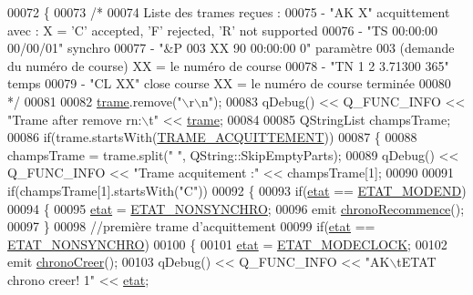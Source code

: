 \begin{DoxyCode}
00072 \{
00073     \textcolor{comment}{/*}
00074 \textcolor{comment}{      Liste des trames reçues :}
00075 \textcolor{comment}{      - "AK X" acquittement avec : X = 'C' accepted, 'F' rejected, 'R' not supported}
00076 \textcolor{comment}{      - "TS 00:00:00 00/00/01" synchro}
00077 \textcolor{comment}{      - "&P 003 XX 90 00:00:00 0" paramètre 003 (demande du numéro de course) XX = le numéro de course}
00078 \textcolor{comment}{      - "TN 1 2     3.71300  365" temps}
00079 \textcolor{comment}{      - "CL XX" close course XX = le numéro de course terminée}
00080 \textcolor{comment}{     */}
00081 
00082     \hyperlink{class_chrono_a26f2155aa6e5ef4296e5456b64a713b5}{trame}.remove(\textcolor{stringliteral}{"\(\backslash\)r\(\backslash\)n"});
00083     qDebug() << Q\_FUNC\_INFO << \textcolor{stringliteral}{"Trame after remove rn:\(\backslash\)t"} << \hyperlink{class_chrono_a26f2155aa6e5ef4296e5456b64a713b5}{trame};
00084 
00085     QStringList champsTrame;
00086     \textcolor{keywordflow}{if}(trame.startsWith(\hyperlink{chrono_8h_a2c9f7b58ba826bd8365c9a611389fe42}{TRAME\_ACQUITTEMENT}))
00087     \{
00088         champsTrame = trame.split(\textcolor{stringliteral}{" "}, QString::SkipEmptyParts);
00089         qDebug() << Q\_FUNC\_INFO << \textcolor{stringliteral}{"Trame acquitement :"} << champsTrame[1];
00090 
00091         \textcolor{keywordflow}{if}(champsTrame[1].startsWith(\textcolor{stringliteral}{"C"}))
00092         \{
00093             \textcolor{keywordflow}{if}(\hyperlink{class_chrono_ad82d4f2a230290aa9695f12bf5ac02e8}{etat} == \hyperlink{chrono_8h_a8d3c4247ab94fd8e6757811fb4001f1e}{ETAT\_MODEND})
00094             \{
00095                 \hyperlink{class_chrono_ad82d4f2a230290aa9695f12bf5ac02e8}{etat} = \hyperlink{chrono_8h_af1a61de8ee28781dbc28e0d7d43c158e}{ETAT\_NONSYNCHRO};
00096                 emit \hyperlink{class_chrono_ab697687f26503bee2b9c9e6f2a073f14}{chronoRecommence}();
00097             \}
00098             \textcolor{comment}{//première trame d'acquittement}
00099             \textcolor{keywordflow}{if}(\hyperlink{class_chrono_ad82d4f2a230290aa9695f12bf5ac02e8}{etat} == \hyperlink{chrono_8h_af1a61de8ee28781dbc28e0d7d43c158e}{ETAT\_NONSYNCHRO})
00100             \{
00101                 \hyperlink{class_chrono_ad82d4f2a230290aa9695f12bf5ac02e8}{etat} = \hyperlink{chrono_8h_ac7f40e9c99ad9f32b52bbe642c29fa35}{ETAT\_MODECLOCK};
00102                 emit \hyperlink{class_chrono_a60ef5586dd429ab616c2b02c143daedf}{chronoCreer}();
00103                 qDebug() << Q\_FUNC\_INFO << \textcolor{stringliteral}{"AK\(\backslash\)tETAT chrono creer! 1"} << \hyperlink{class_chrono_ad82d4f2a230290aa9695f12bf5ac02e8}{etat};

\end{DoxyCode}
